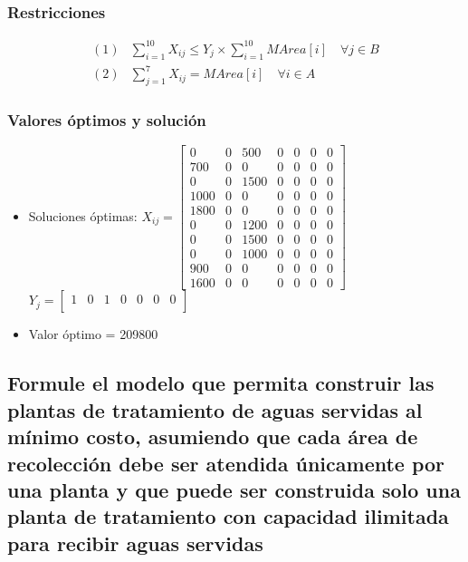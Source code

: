 \documentclass[a4paper,12pt]{article}
\begin{document}
\subsubsection{Restricciones}
\begin{equation*}
\begin{split}
	(1)& \sum_{i=1}^{10}X_{ij}\leq Y_{j}\times \sum_{i=1}^{10}MArea[i]\quad\forall j\in B\\
	(2)&\sum_{j=1}^{7}X_{ij}=MArea[i]\quad\forall i\in A
\end{split}
\end{equation*}
\subsubsection{Valores óptimos y solución}
\begin{itemize}
	\item Soluciones óptimas: $X_{ij}=
	\begin{bmatrix}
	0 & 0 & 500 & 0 & 0 & 0 & 0\\
	700 & 0 & 0 & 0 & 0 & 0 & 0\\
	0 & 0 & 1500 & 0 & 0 & 0 & 0\\
	1000 & 0 & 0 & 0 & 0 & 0 & 0\\
	1800 & 0 & 0 & 0 & 0 & 0 & 0\\
	0 & 0 & 1200 & 0 & 0 & 0 & 0\\
	0 & 0 & 1500 & 0 & 0 & 0 & 0\\
	0 & 0 & 1000 & 0 & 0 & 0 & 0\\
	900 & 0 & 0 & 0 & 0 & 0 & 0\\
	1600 & 0 & 0 & 0 & 0 & 0 & 0
	\end{bmatrix}$
	\\
	$Y_{j}=
	\begin{bmatrix}
	1 & 0 & 1 & 0 & 0 & 0 & 0\\
	\end{bmatrix}$
	\item Valor óptimo = 209800
\end{itemize}
\subsection{Formule  el  modelo  que  permita  construir  las  plantas de  tratamiento  de  aguas  servidas  al  mínimo  costo, asumiendo  que  cada  área  de  recolección  debe  ser  atendida  únicamente  por  una  planta  y  que  puede  ser construida solo una planta de tratamiento con capacidad ilimitada para recibir aguas servidas}
\end{document}
